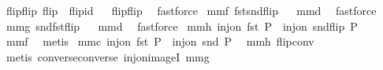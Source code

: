 \begin{isabellebody}
\isanewline
{}\isamarkupfalse%
\ flip{\isacharunderscore}flip{}{\isacharcolon}\ {\isachardoublequoteopen}flip\ {\isasymcirc}\ flip{\isacharequal}id{\isachardoublequoteclose}%
\isadelimproof
\ %
\endisadelimproof
%
\isatagproof
{}\isamarkupfalse%
\ flip{\isacharunderscore}flip\ \isamarkupfalse%
\ fastforce%
\endisatagproof
{\isafoldproof}%
%
\isadelimproof
%
\endisadelimproof
\isanewline
{}\isamarkupfalse%
\ mm{}{}f{\isacharcolon}\ {\isachardoublequoteopen}fst{\isacharequal}{\isacharparenleft}snd{\isasymcirc}flip{\isacharparenright}{\isachardoublequoteclose}%
\isadelimproof
\ %
\endisadelimproof
%
\isatagproof
{}\isamarkupfalse%
\ mm{}{}d\ \isamarkupfalse%
\ fastforce%
\endisatagproof
{\isafoldproof}%
%
\isadelimproof
%
\endisadelimproof
\isanewline
{}\isamarkupfalse%
\ mm{}{}g{\isacharcolon}\ {\isachardoublequoteopen}snd{\isacharequal}{\isacharparenleft}fst{\isasymcirc}flip{\isacharparenright}{\isachardoublequoteclose}%
\isadelimproof
\ %
\endisadelimproof
%
\isatagproof
{}\isamarkupfalse%
\ mm{}{}d\ \isamarkupfalse%
\ fastforce%
\endisatagproof
{\isafoldproof}%
%
\isadelimproof
%
\endisadelimproof
\isanewline
{}\isamarkupfalse%
\ mm{}{}h{\isacharcolon}\ {\isachardoublequoteopen}inj{\isacharunderscore}on\ fst\ P\ {\isacharequal}\ inj{\isacharunderscore}on\ {\isacharparenleft}snd{\isasymcirc}flip{\isacharparenright}\ P{\isachardoublequoteclose}%
\isadelimproof
\ %
\endisadelimproof
%
\isatagproof
{}\isamarkupfalse%
\ mm{}{}f\ \isamarkupfalse%
\ metis%
\endisatagproof
{\isafoldproof}%
%
\isadelimproof
%
\endisadelimproof
\isanewline
{}\isamarkupfalse%
\ mm{}{}c{\isacharcolon}\ {\isachardoublequoteopen}inj{\isacharunderscore}on\ fst\ P\ {\isacharequal}\ inj{\isacharunderscore}on\ snd\ {\isacharparenleft}P{\isacharcircum}{\isacharminus}{}{\isacharparenright}{\isachardoublequoteclose}\ \isanewline
%
\isadelimproof
%
\endisadelimproof
%
\isatagproof
{}\isamarkupfalse%
\ mm{}{}h\ flip{\isacharunderscore}conv\ \isamarkupfalse%
\ {\isacharparenleft}metis\ converse{\isacharunderscore}converse\ inj{\isacharunderscore}on{\isacharunderscore}imageI\ mm{}{}g{\isacharparenright}%
\endisatagproof
{\isafoldproof}%

\end{isabellebody}
